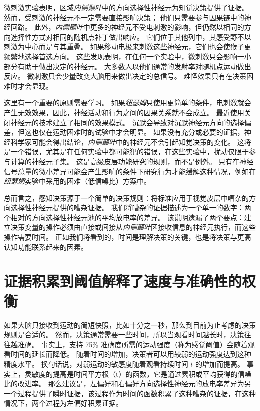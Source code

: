 微刺激实验表明，区域\textit{内侧颞叶}中的方向选择性神经元为知觉决策提供了证据。
然而，受刺激的神经元不一定需要直接影响决策；
他们只需要参与因果链中的神经回路。
此外，\textit{内侧颞叶}中更多的神经元不受电刺激的影响，但仍然以相同的方向选择性方式对相同的随机点补丁做出响应。
它们位于其他列中，其感受野不以刺激为中心而是与其重叠。
如果移动电极来刺激这些神经元，它们也会使猴子更频繁地选择首选方向。
这些发现表明，在任何一个实验中，微刺激只会影响一小部分有助于做出决定的神经元。
大多数人以他们通常的发射率对随机点运动做出反应。
微刺激只会少量改变大脑用来做出决定的总信号。
难怪效果只有在决策困难时才会显现。


这里有一个重要的原则需要学习。
如果\textit{纽瑟姆}只使用更简单的条件，电刺激就会产生无效效果，因此，神经活动和行为之间的因果关系就不会成立。
最近使用关闭神经元的技术建立了相同的效果模式。
沉默会导致对沉默神经元方向的选择偏差，但这也仅在运动困难时的试验中才会明显。
如果没有充分或必要的证据，神经科学家可能会得出结论，\textit{内侧颞叶}中的神经元不会引起知觉决策的变化。
这将是一个错误，尤其是在任何实验中都可能犯的错误，在这些实验中，扰动仅限于参与计算的神经元子集。
这是高级皮层功能研究的规则，而不是例外。
只有在神经信号总量的微小差异可能会产生影响的条件下研究行为才能缓解这种情况，例如在\textit{纽瑟姆}实验中采用的困难（低信噪比）方案中。


总而言之，感知决策源于一个简单的决策规则：将标准应用于视觉皮层中嘈杂的方向选择性神经元提供的嘈杂证据。
我们将嘈杂的证据描述为一个单一的数字：两个相对的方向选择性神经元池的平均放电率的差异。
该说明遗漏了两个要点：建立决策变量的操作必须由直接或间接从\textit{内侧颞叶}区接收信息的神经元执行，而这些操作需要时间。
正如我们将看到的，时间是理解决策的关键，也是将决策与更高认知功能联系起来的因素。



\section{证据积累到阈值解释了速度与准确性的权衡}

如果大脑只接收到运动的简短快照，比如十分之一秒，那么到目前为止考虑的决策规则是合适的。
然而，决策通常需要一些时间，所以当观看时间越长时，决策往往越准确。
事实上，支持 75\% 准确度所需的运动强度（称为感觉阈值）会随着观看时间的延长而降低。
随着时间的增加，决策者可以用较弱的运动强度达到这种精度水平。
换句话说，对弱运动的敏感度随着观看持续时间 $ t $ 的增加而提高。
事实上，灵敏度的提高是时间平方根（t）的函数，它是通过累积或平均获得的信噪比的改进率。
那么建议是，左偏好和右偏好方向选择性神经元的放电率差异为另一个过程提供了瞬时证据，该过程作为时间的函数积累了这种嘈杂的证据，在这种情况下，两个过程为左偏好积累证据。


